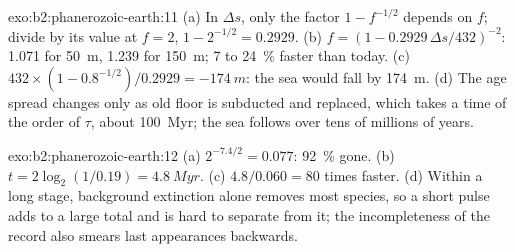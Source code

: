 \begin{solution}{exo:b2:phanerozoic-earth:11}
(a) In $\Delta s$, only the factor $1 - f^{-1/2}$ depends on $f$; divide by its value at $f = 2$,
$1 - 2^{-1/2} = 0.2929$. (b) $f = (1 - 0.2929\,\Delta s/432)^{-2}$: 1.071 for \qty{50}{m}, 1.239
for \qty{150}{m}; 7 to \qty{24}{\percent} faster than today. (c) $432 \times (1 -
0.8^{-1/2})/0.2929 = \qty{-174}{m}$: the sea would fall by \qty{174}{m}. (d) The age spread
changes only as old floor is subducted and replaced, which takes a time of the order of $\tau$,
about \qty{100}{Myr}; the sea follows over tens of millions of years.
\end{solution}

\begin{solution}{exo:b2:phanerozoic-earth:12}
(a) $2^{-7.4/2} = 0.077$: \qty{92}{\percent} gone. (b) $t = 2\log_2(1/0.19) = \qty{4.8}{Myr}$.
(c) $4.8/0.060 = 80$ times faster. (d) Within a long stage, background extinction alone removes
most species, so a short pulse adds to a large total and is hard to separate from it; the
incompleteness of the record also smears last appearances backwards.
\end{solution}

